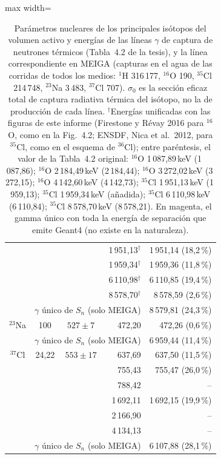 \documentclass[11pt,a4paper]{article}
\begin{document}
\begin{table}[H]
\begin{adjustbox}{max width=\linewidth}
\begin{tabular}{cccrr}
\rowcolor{gray!15} &  &  & 1\,951,13$^\dagger$ & 1\,951,14 \;(18,2\,\%) \\
\rowcolor{gray!15} &  &  & 1\,959,34$^\dagger$ & 1\,959,36 \;(11,8\,\%) \\
\rowcolor{gray!15} &  &  & 6\,110,98$^\dagger$ & 6\,110,85 \;(19,4\,\%) \\
\rowcolor{gray!15} &  &  & 8\,578,70$^\dagger$ & 8\,578,59 \;(2,6\,\%) \\
\rowcolor{gray!15} & \multicolumn{3}{r}{\textcolor{magenta!70!black}{$\gamma$ único de $S_n$ (solo MEIGA)}} & \textcolor{magenta!70!black}{8\,579,81 \;(24,3\,\%)} \\
\midrule
$^{23}$Na & 100 & $527 \pm 7$ & 472,20 & 472,26 \;(0,6\,\%) \\
 & \multicolumn{3}{r}{\textcolor{magenta!70!black}{$\gamma$ único de $S_n$ (solo MEIGA)}} & \textcolor{magenta!70!black}{6\,959,44 \;(11,4\,\%)} \\
\midrule
\rowcolor{gray!15}$^{37}$Cl & 24,22 & $553 \pm 17$ & 637,69 & 637,50 \;(11,5\,\%) \\
\rowcolor{gray!15} &  &  & 755,43 & 755,47 \;(26,0\,\%) \\
\rowcolor{gray!15} &  &  & 788,42 & -- \\
\rowcolor{gray!15} &  &  & 1\,692,11 & 1\,692,15 \;(19,9\,\%) \\
\rowcolor{gray!15} &  &  & 2\,166,90 & -- \\
\rowcolor{gray!15} &  &  & 4\,134,13 & -- \\
\rowcolor{gray!15} & \multicolumn{3}{r}{\textcolor{magenta!70!black}{$\gamma$ único de $S_n$ (solo MEIGA)}} & \textcolor{magenta!70!black}{6\,107,88 \;(28,1\,\%)} \\
\bottomrule\end{tabular}\end{adjustbox}
\caption{Parámetros nucleares de los principales isótopos del volumen activo y energías de las líneas $\gamma$ de captura de neutrones térmicos (Tabla~4.2 de la tesis), y la línea correspondiente en MEIGA
(capturas en el agua de las corridas de todos los medios: $^{1}$H 316\,177, $^{16}$O 190, $^{35}$Cl 214\,748, $^{23}$Na 3\,483, $^{37}$Cl 707). $\sigma_0$ es la sección eficaz total de captura radiativa térmica del isótopo, no la de producción de cada línea.
$^\dagger$Energías unificadas con las figuras de este informe (Firestone y Révay 2016 para $^{16}$O, como en la Fig.~4.2; ENSDF, Nica et al.~2012, para $^{35}$Cl, como en el esquema de $^{36}$Cl); entre paréntesis, el valor de la Tabla~4.2 original: $^{16}$O 1\,087,89\,keV (1\,087,86); $^{16}$O 2\,184,49\,keV (2\,184,44); $^{16}$O 3\,272,02\,keV (3\,272,15); $^{16}$O 4\,142,60\,keV (4\,142,73); $^{35}$Cl 1\,951,13\,keV (1\,959,13); $^{35}$Cl 1\,959,34\,keV (añadida); $^{35}$Cl 6\,110,98\,keV (6\,110,84); $^{35}$Cl 8\,578,70\,keV (8\,578,21). En magenta, el gamma único con toda la energía de separación que emite Geant4 (no existe en la naturaleza).}\label{tab:tabla42}\end{table}
\end{document}
